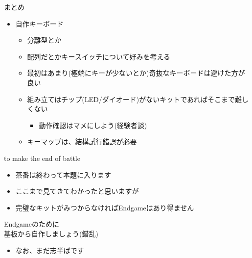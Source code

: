 \documentclass[cjk,dvipdfmx,10pt,compress,fragile%
hyperref={bookmarks=true,bookmarksnumbered=true,bookmarksopen=false,%
colorlinks=false,%
pdftitle={第 134 回 関西 Debian 勉強会},%
pdfauthor={小林},%
pdfsubject={資料},%
}]{beamer}
\begin{document}
\begin{frame}[fragile,t]{まとめ}
 \begin{itemize}
  \item 自作キーボード
	\begin{itemize}
	 \item 分離型とか
	 \item 配列だとかキースイッチについて好みを考える
	 \item 最初はあまり(極端にキーが少ないとか)奇抜なキーボードは避けた方が良い
	 \item 組み立てはチップ(LED/ダイオード)がないキットであればそこまで難しくない
	       \begin{itemize}
		\item 動作確認はマメにしよう(経験者談)
	       \end{itemize}
	 \item キーマップは、結構試行錯誤が必要
	\end{itemize}
 \end{itemize}
\end{frame}


\begin{frame}[fragile,t]{to make the end of battle}
 \begin{itemize}
  \item 茶番は終わって本題に入ります \pause
  \item ここまで見てきてわかったと思いますが \pause
  \item 完璧なキットがみつからなければEndgameはあり得ません \pause
 \end{itemize}
 \vspace*{1zw}
 \begin{center}
  {\huge Endgameのために\\基板から自作しましょう(錯乱)}
 \end{center}
 \pause
 \begin{itemize}
  \item なお、まだ志半ばです
 \end{itemize}
\end{frame}
\end{document}
